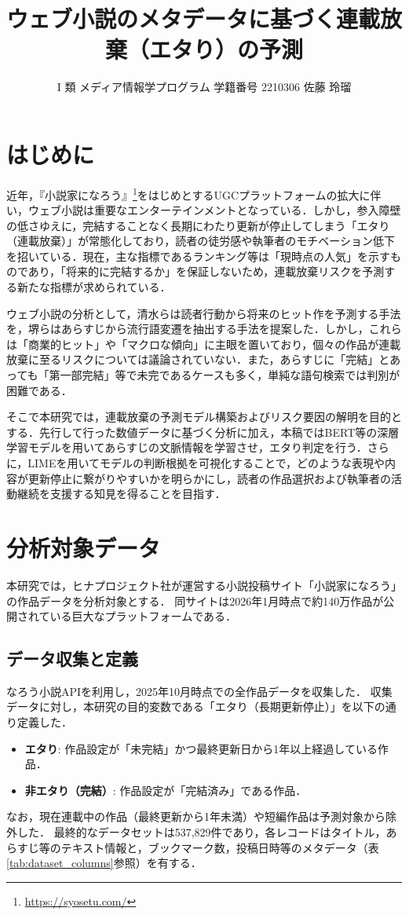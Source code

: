 \documentclass[twocolumn,10pt,a4paper]{jsarticle}
\title{ウェブ小説のメタデータに基づく連載放棄（エタり）の予測}
\author{I 類 メディア情報学プログラム 学籍番号 2210306 佐藤 玲瑠}
\date{}
\begin{document}
\maketitle

\section{はじめに}
近年，『小説家になろう』\footnote{\url{https://syosetu.com/}}をはじめとするUGCプラットフォームの拡大に伴い，ウェブ小説は重要なエンターテインメントとなっている．しかし，参入障壁の低さゆえに，完結することなく長期にわたり更新が停止してしまう「エタり（連載放棄）」が常態化しており，読者の徒労感や執筆者のモチベーション低下を招いている．現在，主な指標であるランキング等は「現時点の人気」を示すものであり，「将来的に完結するか」を保証しないため，連載放棄リスクを予測する新たな指標が求められている．

ウェブ小説の分析として，清水ら\cite{shimizu}は読者行動から将来のヒット作を予測する手法を，堺ら\cite{sakai}はあらすじから流行語変遷を抽出する手法を提案した．しかし，これらは「商業的ヒット」や「マクロな傾向」に主眼を置いており，個々の作品が連載放棄に至るリスクについては議論されていない．また，あらすじに「完結」とあっても「第一部完結」等で未完であるケースも多く，単純な語句検索では判別が困難である．

そこで本研究では，連載放棄の予測モデル構築およびリスク要因の解明を目的とする．先行して行った数値データに基づく分析に加え，本稿ではBERT等の深層学習モデルを用いてあらすじの文脈情報を学習させ，エタり判定を行う．さらに，LIMEを用いてモデルの判断根拠を可視化することで，どのような表現や内容が更新停止に繋がりやすいかを明らかにし，読者の作品選択および執筆者の活動継続を支援する知見を得ることを目指す．

\section{分析対象データ}

本研究では，ヒナプロジェクト社が運営する小説投稿サイト「小説家になろう」の作品データを分析対象とする．
同サイトは2026年1月時点で約140万作品が公開されている巨大なプラットフォームである．

\subsection{データ収集と定義}
なろう小説APIを利用し，2025年10月時点での全作品データを収集した．
収集データに対し，本研究の目的変数である「エタり（長期更新停止）」を以下の通り定義した．
\begin{itemize}
  \item \textbf{エタり}: 作品設定が「未完結」かつ最終更新日から1年以上経過している作品．
  \item \textbf{非エタり（完結）}: 作品設定が「完結済み」である作品．
\end{itemize}
なお，現在連載中の作品（最終更新から1年未満）や短編作品は予測対象から除外した．
最終的なデータセットは537,829件であり，各レコードはタイトル，あらすじ等のテキスト情報と，ブックマーク数，投稿日時等のメタデータ（表\ref{tab:dataset_columns}参照）を有する．
\end{document}
